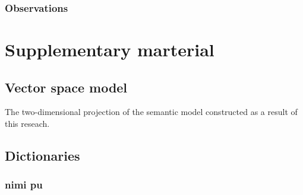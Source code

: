 \documentclass[14pt, a4paper]{extreport}
\begin{document}
\subsection{Observations}

%
%




\printbibliography[heading=bibintoc,title={References}]


\chapter{Supplementary marterial}

\section{Vector space model}

The two-dimensional projection of the semantic model constructed as a result of this reseach.


\section{Dictionaries}

\subsection{nimi pu}
\end{document}
